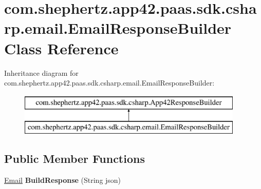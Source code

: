 \hypertarget{classcom_1_1shephertz_1_1app42_1_1paas_1_1sdk_1_1csharp_1_1email_1_1_email_response_builder}{\section{com.\+shephertz.\+app42.\+paas.\+sdk.\+csharp.\+email.\+Email\+Response\+Builder Class Reference}
\label{classcom_1_1shephertz_1_1app42_1_1paas_1_1sdk_1_1csharp_1_1email_1_1_email_response_builder}
}
Inheritance diagram for com.\+shephertz.\+app42.\+paas.\+sdk.\+csharp.\+email.\+Email\+Response\+Builder\+:\begin{figure}[H]
\begin{center}
\leavevmode
\includegraphics[height=2.000000cm]{classcom_1_1shephertz_1_1app42_1_1paas_1_1sdk_1_1csharp_1_1email_1_1_email_response_builder}
\end{center}
\end{figure}
\subsection*{Public Member Functions}
\begin{DoxyCompactItemize}
\item 
\hypertarget{classcom_1_1shephertz_1_1app42_1_1paas_1_1sdk_1_1csharp_1_1email_1_1_email_response_builder_a7c25ed932a9992c67ce8a785960b7cfc}{\hyperlink{classcom_1_1shephertz_1_1app42_1_1paas_1_1sdk_1_1csharp_1_1email_1_1_email}{Email} {\bfseries Build\+Response} (String json)}\label{classcom_1_1shephertz_1_1app42_1_1paas_1_1sdk_1_1csharp_1_1email_1_1_email_response_builder_a7c25ed932a9992c67ce8a785960b7cfc}

\end{DoxyCompactItemize}
